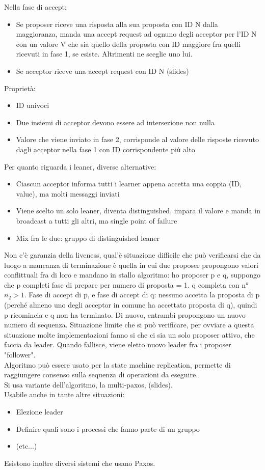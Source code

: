 \documentclass{article}
\begin{document}
Nella fase di accept:
\begin{itemize}
\item Se proposer riceve una risposta alla sua proposta con ID N dalla maggioranza, manda una accept request ad ognuno degli acceptor per l'ID N con un valore V che sia quello della proposta con ID maggiore fra quelli ricevuti in fase 1, se esiste. Altrimenti ne sceglie uno lui.
\item Se acceptor riceve una accept request con ID N (slides)
\end{itemize}
Proprietà:
\begin{itemize}
\item ID univoci
\item Due insiemi di acceptor devono essere ad intersezione non nulla
\item Valore che viene inviato in fase 2, corrisponde al valore delle risposte ricevuto dagli acceptor nella fase 1 con ID corrispondente più alto
\end{itemize}
Per quanto riguarda i leaner, diverse alternative:
\begin{itemize}
\item Ciascun acceptor informa tutti i learner appena accetta una coppia (ID, value), ma molti messaggi inviati
\item Viene scelto un solo leaner, diventa distinguished, impara il valore e manda in broadcast a tutti gli altri, ma single point of failure
\item Mix fra le due: gruppo di distinguished leaner
\end{itemize}
Non c'è garanzia della liveness, qual'è situazione difficile che può verificarsi che da luogo a mancanza di terminazione è quella in cui due proposer propongono valori conflittuali fra di loro e mandano in stallo algoritmo: ho proposer p e q, suppongo che p completi fase di prepare per numero di proposta = 1. q completa con n° $n_2 > 1$. Fase di accept di p, e fase di accept di q: nessuno accetta la proposta di p (perché almeno uno degli acceptor in comune ha accettato proposta di q), quindi p ricomincia e q non ha terminato. Di nuovo, entrambi propongono un nuovo numero di sequenza. Situazione limite che si può verificare, per ovviare a questa situazione molte implementazioni fanno si che ci sia un solo proposer attivo, che faccia da leader. Quando fallisce, viene eletto nuovo leader fra i proposer "follower".\\ Algoritmo può essere usato per la state machine replication, permette di raggiungere consenso sulla sequenza di operazioni da eseguire.\\ Si usa variante dell'algoritmo, la multi-paxos, (slides).\\ Usabile anche in tante altre situazioni:
\begin{itemize}
\item Elezione leader
\item Definire quali sono i processi che fanno parte di un gruppo
\item (etc...)
\end{itemize}
Esistono inoltre diversi sistemi che usano Paxos.
\end{document}
